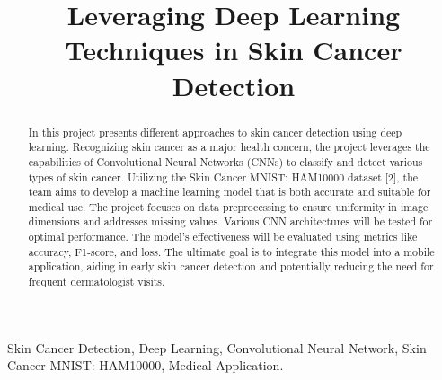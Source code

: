 \documentclass[conference]{IEEEtran}
\begin{document}
\title{Leveraging Deep Learning Techniques in
Skin Cancer Detection\\
}

\author{
\and
{}
\and
{}
}

\maketitle

\begin{abstract}
In this project presents different approaches to skin cancer detection using deep learning. Recognizing skin cancer as a major health concern, the project leverages the capabilities of Convolutional Neural Networks (CNNs) to classify and detect various types of skin cancer. Utilizing the Skin Cancer MNIST: HAM10000 dataset [2], the team aims to develop a machine learning model that is both accurate and suitable for medical use. The project focuses on data preprocessing to ensure uniformity in image dimensions and addresses missing values. Various CNN architectures will be tested for optimal performance. The model's effectiveness will be evaluated using metrics like accuracy, F1-score, and loss. The ultimate goal is to integrate this model into a mobile application, aiding in early skin cancer detection and potentially reducing the need for frequent dermatologist visits.
\newline
\end{abstract}

\begin{IEEEkeywords}

Skin Cancer Detection, Deep Learning, Convolutional Neural Network, Skin Cancer
MNIST: HAM10000, Medical Application.
\end{IEEEkeywords}
\end{document}
